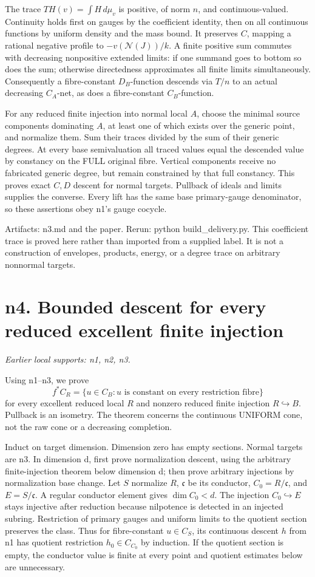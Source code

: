\documentclass[11pt]{article}
\begin{document}
The trace \(TH(v)=\int H\,d\mu_v\) is positive, of norm \(n\), and continuous-valued. Continuity holds first on gauges by the coefficient identity, then on all continuous functions by uniform density and the mass bound. It preserves \(C\), mapping a rational negative profile to \(-v(\mathcal N(J))/k\). A finite positive sum commutes with decreasing nonpositive extended limits: if one summand goes to bottom so does the sum; otherwise directedness approximates all finite limits simultaneously. Consequently a fibre-constant \(D_B\)-function descends via \(T/n\) to an actual decreasing \(C_A\)-net, as does a fibre-constant \(C_B\)-function.

For any reduced finite injection into normal local \(A\), choose the minimal source components dominating \(A\), at least one of which exists over the generic point, and normalize them. Sum their traces divided by the sum of their generic degrees. At every base semivaluation all traced values equal the descended value by constancy on the FULL original fibre. Vertical components receive no fabricated generic degree, but remain constrained by that full constancy. This proves exact \(C,D\) descent for normal targets. Pullback of ideals and limits supplies the converse. Every lift has the same base primary-gauge denominator, so these assertions obey n1's gauge cocycle.

Artifacts: n3.md and the paper. Rerun: python build\_delivery.py. This coefficient trace is proved here rather than imported from a supplied label. It is not a construction of envelopes, products, energy, or a degree trace on arbitrary nonnormal targets.

\section{n4. Bounded descent for every reduced excellent finite injection}
\textit{Earlier local supports: n1, n2, n3.}

Using n1--n3, we prove
\[
f^*C_R=\{u\in C_B:u\text{ is constant on every restriction fibre}\}
\]
for every excellent reduced local \(R\) and nonzero reduced finite injection \(R\hookrightarrow B\). Pullback is an isometry. The theorem concerns the continuous UNIFORM cone, not the raw cone or a decreasing completion.

Induct on target dimension. Dimension zero has empty sections. Normal targets are n3. In dimension d, first prove normalization descent, using the arbitrary finite-injection theorem below dimension d; then prove arbitrary injections by normalization base change. Let \(S\) normalize \(R\), \(\mathfrak c\) be its conductor, \(C_0=R/\mathfrak c\), and \(E=S/\mathfrak c\). A regular conductor element gives \(\dim C_0<d\). The injection \(C_0\hookrightarrow E\) stays injective after reduction because nilpotence is detected in an injected subring. Restriction of primary gauges and uniform limits to the quotient section preserves the class. Thus for fibre-constant \(u\in C_S\), its continuous descent \(h\) from n1 has quotient restriction \(h_0\in C_{C_0}\) by induction. If the quotient section is empty, the conductor value is finite at every point and quotient estimates below are unnecessary.
\end{document}
